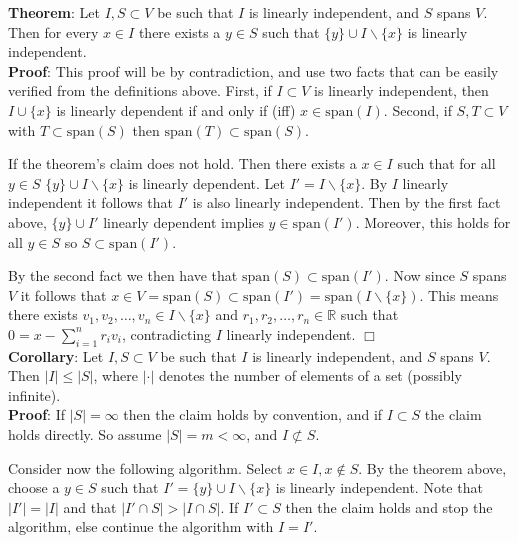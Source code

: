 \documentclass[12pt,oneside]{article}
\begin{document}
\textbf{Theorem}: Let \(I,S \subset V\) be such that \( I \) is linearly independent, and \( S \) spans \(V\). Then for every \(x\in I \) there exists a \(y \in S \) such that \( \{y\} \cup I \backslash \{x\}\) is linearly independent. \\

\textbf{Proof}: This proof will be by contradiction, and use two facts that can be easily verified from the definitions above. First, if \(I \subset V\) is linearly independent, then \( I \cup \{x\} \) is linearly dependent if and only if (iff) \(x \in \text{span}(I) \). Second, if  \(S,T \subset V\) with \(T \subset \text{span}(S) \) then \(\text{span}(T) \subset \text{span}(S) \).

If the theorem's claim does not hold. Then there exists a \( x \in I \) such that for all \( y \in S \) \( \{y\} \cup I \backslash \{x\}\) is linearly dependent. Let \( I'=I \backslash \{x\} \). By \(I \) linearly independent it follows that \( I' \) is also linearly independent. Then by the first fact above, \(\{y\} \cup I' \) linearly dependent implies \( y \in \text{span}(I') \). Moreover, this holds for all \( y \in S \) so \( S \subset \text{span}(I') \).

By the second fact we then have that \( \text{span}(S) \subset \text{span}(I') \). Now since \( S \) spans \(V\) it follows that \(x \in V =\text{span}(S) \subset \text{span}(I') =\text{span}(I\backslash \{x\}) \). This means there exists \(v_1,v_2,\dots,v_n \in I \backslash \{x\} \) and \(r_1,r_2,\dots,r_n \in \mathbb{R} \) such that \(0 =x- \sum_{i=1}^{n} r_iv_i \), contradicting \(I \) linearly independent. $\Box$\\


\textbf{Corollary}: Let \(I,S \subset V\) be such that \( I \) is linearly independent, and \( S \) spans \(V\). Then \( |I| \le |S| \), where \( |\cdotp|\) denotes the number of elements of a set (possibly infinite).\\

\textbf{Proof}: If \( |S| = \infty \) then the claim holds by convention, and if \( I \subset S \) the claim holds directly. So assume \( |S|=m < \infty \), and \( I \not \subset S \).

Consider now the following algorithm. Select \( x \in I, x\notin S\). By the theorem above, choose a \( y \in S \) such that \( I'= \{y\}\cup I\backslash\{x\} \) is linearly independent. Note that \( |I'|=|I| \) and that \( |I'\cap S| >  |I\cap S| \). If \(I' \subset S \) then the claim holds and stop the algorithm, else continue the algorithm with \(I=I'\).
\end{document}

